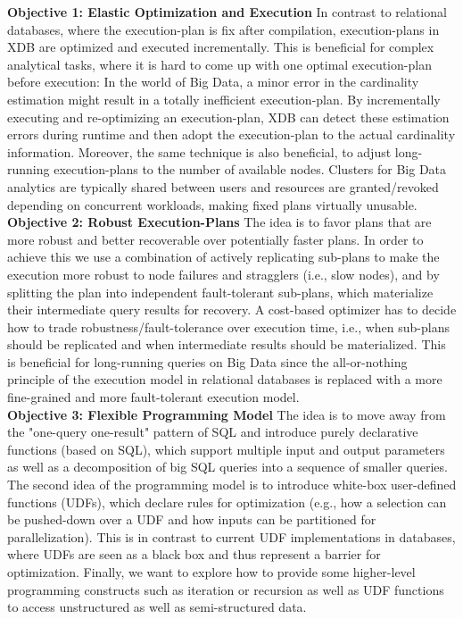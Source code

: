 \documentclass{sig-alternate}
\begin{document}
{\bf Objective 1: Elastic Optimization and Execution}
In contrast to relational databases, where the execution-plan is fix after compilation, execution-plans in XDB are optimized and executed incrementally. This is beneficial for complex analytical tasks, where it is hard to come up with one optimal execution-plan before execution: In the world of Big Data, a minor error in the cardinality estimation might result in a totally inefficient execution-plan. By incrementally executing and re-optimizing an execution-plan, XDB can detect these estimation errors during runtime and then adopt the execution-plan to the actual cardinality information. Moreover, the same technique is also beneficial, to adjust long-running execution-plans to the number of available nodes. Clusters for Big Data analytics are typically shared between users and resources are granted/revoked depending on concurrent workloads, making fixed plans virtually unusable. \\

{\bf Objective 2:  Robust Execution-Plans}
The idea is to favor plans that are more robust and better recoverable over potentially faster plans. In order to achieve this we use a combination of actively replicating sub-plans to make the execution more robust to node failures and stragglers (i.e., slow nodes), and by splitting the plan into independent fault-tolerant sub-plans, which materialize their intermediate query results for recovery. A cost-based optimizer has to decide how to trade robustness/fault-tolerance over execution time, i.e., when sub-plans should be replicated and when intermediate results should be materialized.  This is beneficial for long-running queries on Big Data since the all-or-nothing principle of the execution model in relational databases is replaced with a more fine-grained and more fault-tolerant execution model. \\

{\bf Objective 3: Flexible Programming Model} 
The idea is to move away from the "one-query one-result" pattern of SQL and introduce purely declarative functions (based on SQL), which support multiple input and output parameters as well as a decomposition of big SQL queries into a sequence of smaller queries. The second idea of the programming model is to introduce white-box user-defined functions (UDFs), which declare rules for optimization (e.g., how a selection can be pushed-down over a UDF and how inputs can be partitioned for parallelization). This is in contrast to current UDF implementations in databases, where UDFs are seen as a black box and thus represent a barrier for optimization. Finally, we want to explore how to provide some higher-level programming constructs such as iteration or recursion as well as UDF functions to access unstructured as well as semi-structured data. \\
\end{document}
